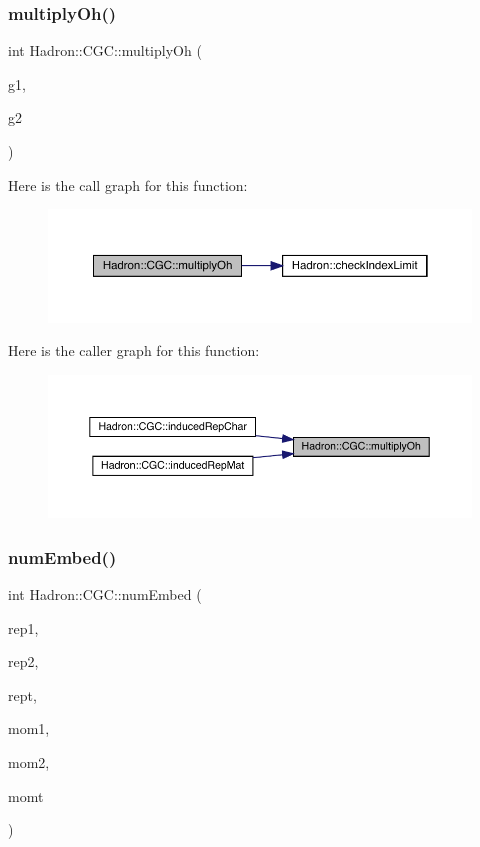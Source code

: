 \subsubsection{\texorpdfstring{multiplyOh()}{multiplyOh()}}
{\footnotesize\ttfamily int Hadron\+::\+C\+G\+C\+::multiply\+Oh (\begin{DoxyParamCaption}\item[{const int}]{g1,  }\item[{const int}]{g2 }\end{DoxyParamCaption})}

Here is the call graph for this function\+:\nopagebreak
\begin{figure}[H]
\begin{center}
\leavevmode
\includegraphics[width=350pt]{d9/d19/namespaceHadron_1_1CGC_a16432200edf54430116d5593f2f755d6_cgraph}
\end{center}
\end{figure}
Here is the caller graph for this function\+:\nopagebreak
\begin{figure}[H]
\begin{center}
\leavevmode
\includegraphics[width=350pt]{d9/d19/namespaceHadron_1_1CGC_a16432200edf54430116d5593f2f755d6_icgraph}
\end{center}
\end{figure}
\mbox{\label{namespaceHadron_1_1CGC_af727ac6be27b471bc40b4696c2a29cdb}} 
\subsubsection{\texorpdfstring{numEmbed()}{numEmbed()}}
{\footnotesize\ttfamily int Hadron\+::\+C\+G\+C\+::num\+Embed (\begin{DoxyParamCaption}\item[{const std\+::string \&}]{rep1,  }\item[{const std\+::string \&}]{rep2,  }\item[{const std\+::string \&}]{rept,  }\item[{const Array\+Int \&}]{mom1,  }\item[{const Array\+Int \&}]{mom2,  }\item[{const Array\+Int \&}]{momt }\end{DoxyParamCaption})}

